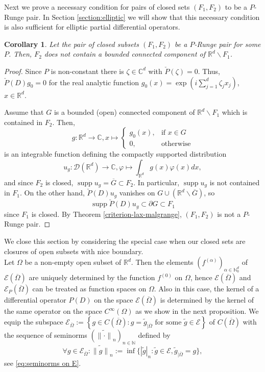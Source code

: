 \documentclass[10pt,leqno]{amsart}
\newtheorem{corollary}[prop]{Corollary}
\theoremstyle{definition}
\newcommand{\R}{\mathbb R}
\newcommand{\N}{\mathbb N}
\newcommand{\C}{\mathbb C}
\newcommand{\supp}{\operatorname{supp}}
\begin{document}
Next we prove a necessary condition for pairs of closed sets $(F_1, F_2)$ to be a $P$-Runge pair. In Section \ref{section:elliptic} we will show that this necessary condition is also sufficient for elliptic partial differential operators.

\begin{corollary}\label{cor:necessary condition}
	Let the pair of closed subsets $(F_1, F_2)$ be a $P$-Runge pair for some $P$. Then, $F_2$ does not contain a bounded connected component of $\R^d\backslash F_1$. 
\end{corollary}

\begin{proof}
	Since $P$ is non-constant there is $\zeta\in\C^d$ with $\check{P}(\zeta)=0$. Thus, $\check{P}(D)g_0=0$ for the real analytic function $g_0(x)=\exp\left(i\sum_{j=1}^d \zeta_j x_j\right)$, $x\in\R^d$.
	
	Assume that $G$ is a bounded (open) connected component of $\R^d\backslash F_1$ which is contained in $F_2$. Then,
	$$g:\R^d\to\C,x\mapsto\begin{cases}
		g_0(x),&\text{if }x\in G\\ 0,&\text{otherwise}
	\end{cases}$$
	is an integrable function defining the compactly supported distribution
	$$u_g:\mathscr{D}(\R^d)\to\C,\varphi\mapsto \int_{\R^d}g(x)\varphi(x)dx,$$
	and since $F_2$ is closed, $\supp u_g=\overline{G}\subset F_2$. In particular, $\supp u_g$ is not contained in $F_1$. On the other hand, $\check{P}(D) u_g$ vanishes on $G\cup (\R^d\backslash\overline{G})$, so
	$$\supp\check{P}(D)u_g\subset\partial G\subset F_1$$
	since $F_1$ is closed. By Theorem \ref{criterion-lax-malgrange}, $(F_1,F_2)$ is not a $P$-Runge pair.
\end{proof}

We close this section by considering the special case when our closed sets are closures of open subsets with nice boundary.\\

Let $\Omega$ be a non-empty open subset of $\R^d$. Then the elements $(f^{(\alpha)})_{\alpha\in\N_0^d}$ of $\mathscr{E}(\overline{\Omega})$ are uniquely determined by the function $f^{(0)}$ on $\Omega$, hence $\mathscr{E}(\overline\Omega)$ and $\mathscr{E}_P(\overline\Omega)$ can be treated as function spaces on $\Omega$. Also in this case, the kernel of a differential operator $P(D)$ on the space $\mathscr{E}(\overline\Omega)$ is determined by the kernel of the same operator on the space $C^\infty(\Omega)$ as we show in the next proposition. We equip the subspace $\mathscr{E}_{\overline{\Omega}}:=\left\{g\in C(\overline{\Omega})\colon g=\tilde{g}_{\mid\overline{\Omega}} \text{ for some }\tilde{g}\in\mathscr{E} \right\}$ of $C(\overline{\Omega})$ with the sequence of seminorms $(\widetilde{\|\cdot\|}_n)_{n\in\N}$ defined by 
$$\forall g\in\mathscr{E}_{\overline{\Omega}}\colon\widetilde{\|g\|}_n:=\inf\{|\tilde{g}|_n\colon \tilde{g}\in\mathscr{E}, \tilde{g}_{\mid\overline{\Omega}}=g\},$$
see \eqref{eq:seminorms on E}.
\end{document}
